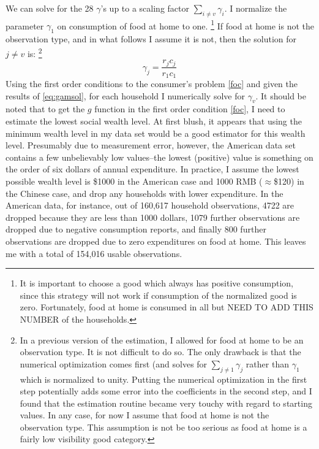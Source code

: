 \documentclass{article}
\begin{document}
We can solve for the 28 $\gamma$'s up to a scaling factor $\sum_{i\neq v}\gamma_i$.
I normalize the parameter $\gamma_1$ on consumption of food at home to one. 
\footnote{It is important to choose a good which always has positive consumption, since this strategy will not work if consumption of the normalized good is zero.  
Fortunately, food at home is consumed in all but NEED TO ADD THIS NUMBER of the households.}
If food at home is not the observation type, and in what follows I assume it is not, then the solution for $j \neq v$ is:
\footnote{In a previous version of the estimation, I allowed for food at home to be an observation type.
It is not difficult to do so.
The only drawback is that the numerical optimization comes first (and solves for $\sum_{j \neq 1} \gamma_j$ rather than $\gamma_1$ which is normalized to unity.  
Putting the numerical optimization in the first step potentially adds some error into the coefficients in the second step, and I found that the estimation routine became very touchy with regard to starting values.
In any case, for now I assume that food at home is not the observation type.
This assumption is not be too serious as food at home is a fairly low visibility good category.
}
\begin{equation}
	\label{eq:gamsol}
	\gamma_j = \frac{r_j c_j}{r_1 c_1}
\end{equation}
Using the first order conditions to the consumer's problem \eqref{foc} and given the results of \eqref{eq:gamsol}, for each household I numerically solve for  $\gamma_v$.
It should be noted that to get the $g$ function in the first order condition \eqref{foc}, I need to estimate the lowest social wealth level. 
At first blush, it appears that using the minimum wealth level in my data set would be a good estimator for this wealth level.
Presumably due to measurement error, however, the American data set contains a few unbelievably low values--the lowest (positive) value is something on the order of six dollars of annual expenditure.
In practice, I assume the lowest possible wealth level is \$1000 in the American case and 1000 RMB ($\approx$\$120) in the Chinese case, and drop any households with lower expenditure.
In the American data, for instance, out of 160,617 household observations, 4722 are dropped because they are less than 1000 dollars, 1079 further observations are dropped due to negative consumption reports, and finally 800 further observations are dropped due to zero expenditures on food at home.
This leaves me with a total of 154,016 usable observations.
\end{document}
